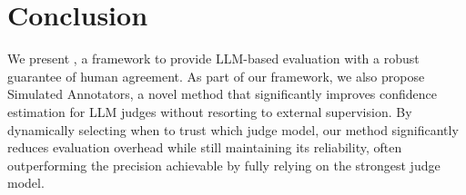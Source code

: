\section{Conclusion}
We present \method, a framework to provide LLM-based evaluation with a robust guarantee of human agreement. As part of our framework, we also propose Simulated Annotators, a novel method that significantly improves confidence estimation for LLM judges without resorting to external supervision. By dynamically selecting when to trust which judge model, our method significantly reduces evaluation overhead while still maintaining its reliability, often outperforming the precision achievable by fully relying on the strongest judge model.